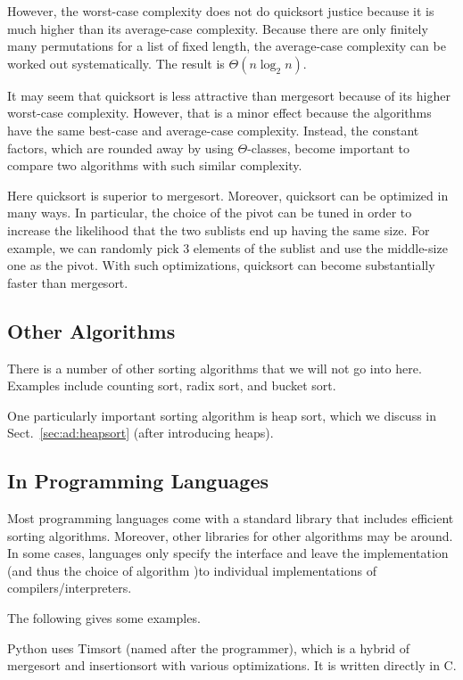 However, the worst-case complexity does not do quicksort justice because it is much higher than its average-case complexity.
Because there are only finitely many permutations for a list of fixed length, the average-case complexity can be worked out systematically.
The result is $\Theta(n\log_2 n)$.
\medskip

It may seem that quicksort is less attractive than mergesort because of its higher worst-case complexity.
However, that is a minor effect because the algorithms have the same best-case and average-case complexity.
Instead, the constant factors, which are rounded away by using $\Theta$-classes, become important to compare two algorithms with such similar complexity.

Here quicksort is superior to mergesort.
Moreover, quicksort can be optimized in many ways.
In particular, the choice of the pivot can be tuned in order to increase the likelihood that the two sublists end up having the same size.
For example, we can randomly pick $3$ elements of the sublist and use the middle-size one as the pivot.
With such optimizations, quicksort can become substantially faster than mergesort.

\subsection{Other Algorithms}

There is a number of other sorting algorithms that we will not go into here.
Examples include counting sort, radix sort, and bucket sort.

One particularly important sorting algorithm is heap sort, which we discuss in Sect.~\ref{sec:ad:heapsort} (after introducing heaps).

\subsection{In Programming Languages}

Most programming languages come with a standard library that includes efficient sorting algorithms.
Moreover, other libraries for other algorithms may be around.
In some cases, languages only specify the interface and leave the implementation (and thus the choice of algorithm )to individual implementations of compilers/interpreters.

The following gives some examples.

Python uses Timsort (named after the programmer), which is a hybrid of mergesort and insertionsort with various optimizations.
It is written directly in C.

